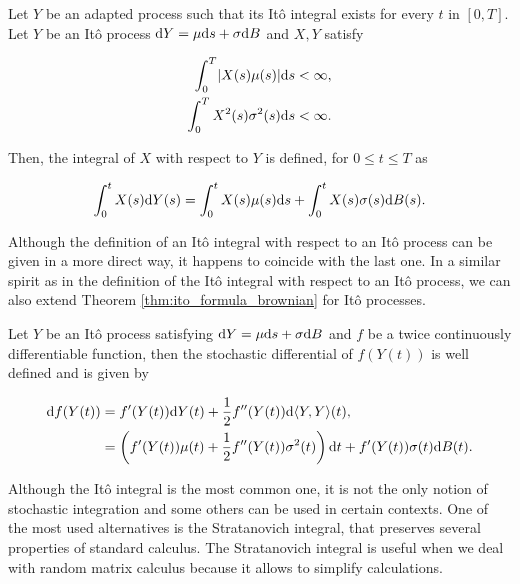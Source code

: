  \begin{definition}
    Let $Y$ be an adapted process such that its Itô integral exists for every $t$ in $[0,T]$. Let $Y$ be an Itô process $\mathrm d Y = \mu \mathrm d s + \sigma \mathrm d B$ and $X, Y$ satisfy

    \begin{align*}
        \int_0^T \lvert  X(s) \mu(s) \rvert \mathrm d s &< \infty,\\
        \int_0^T X^2(s)\sigma^2(s) \mathrm d s & < \infty.
    \end{align*}

    Then, the integral of $X$ with respect to $Y$ is defined, for $0 \le t \le T$ as

    \begin{equation*}
        \int_0^t X(s) \mathrm d Y(s) = \int_0^t X(s) \mu(s) \mathrm d s + \int_0^t X(s) \sigma(s) \mathrm d B(s).
    \end{equation*}

 \end{definition}

 Although the definition of an Itô integral with respect to an Itô process can be given in a more direct way, it happens to coincide with the last one. In a similar spirit as in the definition of the Itô integral with respect to an Itô process, we can also extend Theorem \ref{thm:ito_formula_brownian} for Itô processes.

 \begin{theorem}
    Let $Y$ be an Itô process satisfying $\mathrm d Y = \mu \mathrm d s + \sigma \mathrm d B$ and $f$ be a twice continuously differentiable function, then the stochastic differential of $f(Y(t))$ is well defined and is given by

    \begin{align*}
        \mathrm d f(Y(t)) &= f'(Y(t))\mathrm d Y(t) + \frac12 f''(Y(t)) \mathrm d \langle Y, Y\rangle (t),\\ 
        &= \left( f'(Y(t)) \mu(t) + \frac12 f''(Y(t)) \sigma^2(t) \right)\mathrm d t + f'(Y(t))\sigma(t) \mathrm d B(t).
    \end{align*}
\end{theorem}

Although the Itô integral is the most common one, it is not the only notion of stochastic integration and some others can be used in certain contexts. One of the most used alternatives is the Stratanovich integral, that preserves several properties of standard calculus. The Stratanovich integral is useful when we deal with random matrix calculus because it allows to simplify calculations.

